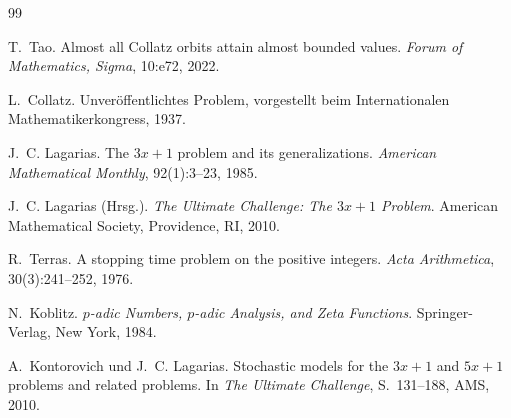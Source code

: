 \documentclass[12pt,a4paper]{article}
\begin{document}
\begin{thebibliography}{99}

T.~Tao.
\newblock Almost all Collatz orbits attain almost bounded values.
\newblock \emph{Forum of Mathematics, Sigma}, 10:e72, 2022.

L.~Collatz.
\newblock Unveröffentlichtes Problem, vorgestellt beim Internationalen Mathematikerkongress, 1937.

J.~C. Lagarias.
\newblock The $3x+1$ problem and its generalizations.
\newblock \emph{American Mathematical Monthly}, 92(1):3--23, 1985.

J.~C. Lagarias (Hrsg.).
\newblock \emph{The Ultimate Challenge: The $3x+1$ Problem}.
\newblock American Mathematical Society, Providence, RI, 2010.

R.~Terras.
\newblock A stopping time problem on the positive integers.
\newblock \emph{Acta Arithmetica}, 30(3):241--252, 1976.

N.~Koblitz.
\newblock \emph{$p$-adic Numbers, $p$-adic Analysis, and Zeta Functions}.
\newblock Springer-Verlag, New York, 1984.

A.~Kontorovich und J.~C. Lagarias.
\newblock Stochastic models for the $3x+1$ and $5x+1$ problems and related problems.
\newblock In \emph{The Ultimate Challenge}, S.\ 131--188, AMS, 2010.

\end{thebibliography}
\end{document}
